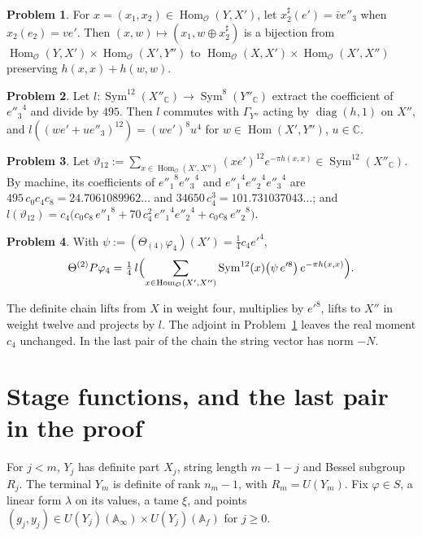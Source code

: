 \documentclass[reqno]{amsart}
\theoremstyle{definition}
\newtheorem{problem}{Problem}[section]
\theoremstyle{plain}
\theoremstyle{remark}
\newcommand{\A}{\mathbb{A}}
\newcommand{\Oc}{\mathcal{O}}
\newcommand{\C}{\mathbb{C}}
\newcommand{\Sym}{\operatorname{Sym}}
\newcommand{\Hom}{\operatorname{Hom}}
\newcommand{\diag}{\operatorname{diag}}
\begin{document}
\begin{problem}\label{pr:regroup}
For \(x=(x_1,x_2)\in\Hom_\Oc(Y,X')\), let \(x_2^\sharp(e')=\bar v e''_3\) when \(x_2(e_2)=ve'\).  Then \((x,w)\mapsto(x_1,w\oplus x_2^\sharp)\) is a bijection from \(\Hom_\Oc(Y,X')\times\Hom_\Oc(X',Y'')\) to \(\Hom_\Oc(X,X')\times\Hom_\Oc(X',X'')\) preserving \(h(x,x)+h(w,w)\).
\end{problem}

\begin{problem}\label{pr:model-l}
Let \(l:\Sym^{12}(X''_\C)\to\Sym^8(Y''_\C)\) extract the coefficient of \({e''_3}^4\) and divide by \(495\).  Then \(l\) commutes with \(\Gamma_{Y''}\) acting by \(\diag(h,1)\) on \(X''\), and \(l((we'+ue''_3)^{12})=(we')^8u^4\) for \(w\in\Hom(X',Y'')\), \(u\in\C\).
\end{problem}

\begin{problem}\label{pr:model-theta}
Let \(\vartheta_{12} := \sum_{x \in \Hom_\Oc(X', X'')} (xe')^{12} e^{-\pi h(x,x)} \in \Sym^{12}(X''_\C)\).  By machine, its coefficients of \({e''_1}^8{e''_3}^4\) and \({e''_1}^4{e''_2}^4{e''_3}^4\) are \(495\,c_0c_4c_8 = 24.7061089962\ldots\) and \(34650\,c_4^3 = 101.731037043\ldots\); and \(l(\vartheta_{12}) = c_4\bigl(c_0c_8\,{e''_1}^8 + 70\,c_4^2\,{e''_1}^4{e''_2}^4 + c_0c_8\,{e''_2}^8\bigr)\).
\end{problem}

\begin{problem}\label{pr:model}
With \(\psi := (\Theta_{(4)}\varphi_4)(X') = \tfrac14c_4e'^4\),
\[
  \Theta^{(2)}P\varphi_4 = \tfrac14\, l\Bigl(\sum_{x \in \Hom_\Oc(X', X'')} \Sym^{12}(x)\bigl(\psi\,e'^8\bigr)\, e^{-\pi h(x,x)}\Bigr) .
\]
\end{problem}

The definite chain lifts from \(X\) in weight four, multiplies by \(e'^8\), lifts to \(X''\) in weight twelve and projects by \(l\).  The adjoint in Problem~\ref{pr:regroup} leaves the real moment \(c_4\) unchanged.  In the last pair of the chain the string vector has norm \(-N\).


\section{Stage functions, and the last pair in the proof}\label{sec:stage}

For \(j<m\), \(Y_j\) has definite part \(X_j\), string length \(m-1-j\) and Bessel subgroup \(R_j\).  The terminal \(Y_m\) is definite of rank \(n_m-1\), with \(R_m=U(Y_m)\).  Fix \(\varphi\in S\), a linear form \(\lambda\) on its values, a tame \(\xi\), and points \((g_j,y_j)\in U(Y_j)(\A_\infty)\times U(Y_j)(\A_f)\) for \(j\ge0\).
\end{document}
